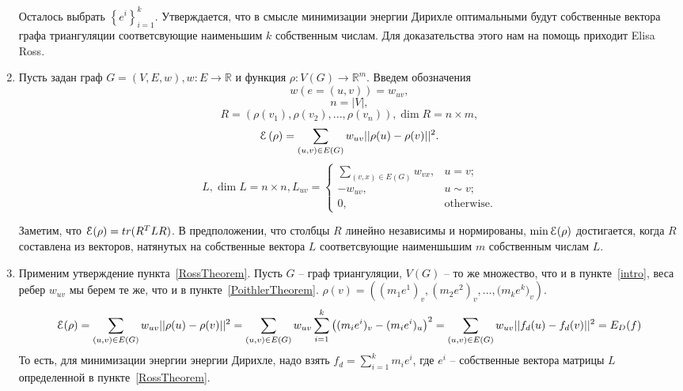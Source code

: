 \documentclass{article}
\begin{document}
\begin{enumerate}
    Осталось выбрать $\left\{ e^i \right\}_{i=1}^k$. Утверждается, что в смысле минимизации энергии Дирихле оптимальными будут собственные вектора графа триангуляции соответсвующие наименьшим $k$ собственным числам. Для доказательства этого нам на помощь приходит Elisa Ross.
    
    \item \label{RossTheorem}
    Пусть задан граф $G = (V, E, w), w: E \to \mathbb{R}$ и функция $\rho: V(G) \to \mathbb{R}^m$. Введем обозначения 
    $$ w(e = (u, v)) = w_{uv},$$
    $$ n = |V|, $$
    $$ R = \left(\rho(v_1), \rho(v_2), ... , \rho(v_n)\right), \dim{R} = n \times m, $$
    $$ \EuScript{E}\left(\rho\right) = \sum_{\left(u, v \right) \in E\left( G \right)}{w_{uv} ||\rho(u) - \rho(v)||^2}.$$
    $$ L, \dim{L} = n \times n, L_{uv} = \begin{cases}
        \sum_{(v, x) \in E(G)}{w_{vx}},&\text{$u = v;$} \\
        -w_{uv},&\text{$u \sim v;$} \\
        0, &\text{otherwise.}
    \end{cases}
    $$
    
    Заметим, что $\EuScript{E}(\rho) = tr(R^T L R)$. В предположении, что столбцы $R$ линейно независимы и нормированы, $\min{\EuScript{E}(\rho)}$ достигается, 
    когда $R$ составлена из векторов, натянутых на собственные вектора $L$ соответсвующие наименшьшим $m$ собственным числам $L$.
     
    \item Применим утверждение пункта~\ref{RossTheorem}. Пусть $G$ -- граф триангуляции, $V(G)$ -- то же множество, что и в пункте~\ref{intro}, 
    веса ребер $w_{uv}$ мы берем те же, что и в пункте~\ref{PoithlerTheorem}. $\rho(v) = \left( {(m_1 e^1)_v}, {(m_2 e^2)_v}, ..., {(m_k e^k})_v \right)$.
    $$
        \EuScript{E}(\rho) = \sum_{\left( u, v \right) \in E \left( G \right)}{w_{uv} ||\rho(u) - \rho(v)||^2} = 
        \sum_{\left( u, v \right) \in E \left( G \right)}{w_{uv} \sum_{i=1}^k{\left((m_i e^i)_v - (m_i e^i)_u \right)^2}} =
        \sum_{\left( u, v \right) \in E \left( G \right)}{w_{uv} ||f_d(u) - f_d(v)||^2} = E_D(f)
    $$
    То есть, для минимизации энергии энергии Дирихле, надо взять $f_d = \sum_{i=1}^k{m_i e^i}$, где $e^i$ -- собственные вектора матрицы $L$ определенной 
    в пункте~\ref{RossTheorem}.
\end{enumerate}
\end{document}
